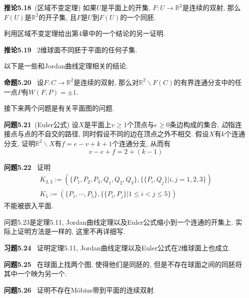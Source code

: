 \documentclass[11pt]{article}
\theoremstyle{definition}\newtheorem*{analyse}{分析}
\newenvironment{env}[1]{\par\vspace{1em}\noindent\textbf{#1}\ }{\par\vspace{1em}}
\begin{document}
\begin{env}{推论5.18}(区域不变定理)
    如果$U$是平面上的开集, $F:U\to\mathbb{R}^2$是连续的双射, 那么$F(U)$是$\mathbb{R}^2$的开子集, 且$F$是$U$到$F(U)$的一个同胚.
\end{env}

利用区域不变定理给出第4章中的一个结论的另一证明.
\begin{env}{推论5.19}
    $2$维球面不同胚于平面的任何子集.
\end{env}

以下是一些和Jordan曲线定理相关的结论.

\begin{env}{命题5.20}
    设$F:C\to\mathbb{R}^2$是连续的双射, 那么对$\mathbb{R}^2\backslash F(C)$的有界连通分支中的任一点$P$有$W(F,P)=\pm 1$.
\end{env}

接下来两个问题是有关平面图的问题.
\begin{env}{问题5.21}(Euler公式)
    设$X$是平面上$v\geq 1$个顶点与$e\geq 0$条边构成的集合, \textit{边}指连接点与点的不自交的路径, 同时假设不同的边在顶点之外不相交.
    假设$X$有$k$个连通分支, 证明$\mathbb{R}^2\backslash X$有$f=e-v+k+1$个连通分支, 从而有
    \[v-e+f=2+(k-1)\]
\end{env}

\begin{env}{问题5.22}
    证明
    \begin{gather*}
        K_{3,3}:=(\{P_1,P_2,P_3,Q_1,Q_2,Q_3\},\{\{P_i,Q_j\}|i,j=1,2,3\})\\
        K_5:=(\{P_1,\cdots,P_5\},\{\{P_i,P_j\}|1\leq i<j\leq 5\})
    \end{gather*}
    不能被嵌入平面.
\end{env}

问题5.23是定理5.11, Jordan曲线定理以及Euler公式缩小到一个连通的开集上.
实际上证明方法是一样的, 这里不再详细写.

\begin{env}{习题5.24}
    证明定理5.11, Jordan曲线定理以及Euler公式在$2$维球面上也成立.
\end{env}

\begin{env}{问题5.25}
    在球面上找两个图, 使得他们是同胚的, 但是不存在球面之间的同胚将其中一个映为另一个.
\end{env}

\begin{env}{问题5.26}
    证明不存在M\"{o}bius带到平面的连续双射.
\end{env}
\end{document}
